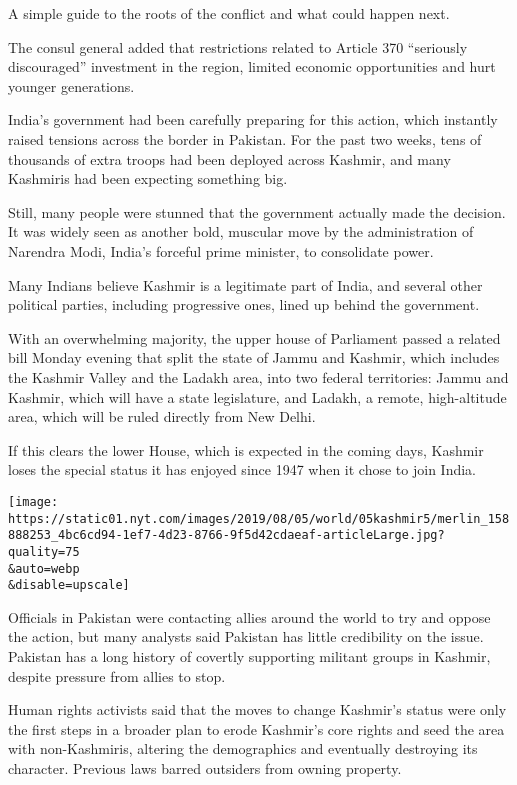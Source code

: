 A simple guide to the roots of the conflict and what could happen next.

The consul general added that restrictions related to Article 370
``seriously discouraged'' investment in the region, limited economic
opportunities and hurt younger generations.

India's government had been carefully preparing for this action, which
instantly raised tensions across the border in Pakistan. For the past
two weeks, tens of thousands of extra troops had been deployed across
Kashmir, and many Kashmiris had been expecting something big.

Still, many people were stunned that the government actually made the
decision. It was widely seen as another bold, muscular move by the
administration of Narendra Modi, India's forceful prime minister, to
consolidate power.

Many Indians believe Kashmir is a legitimate part of India, and several
other political parties, including progressive ones, lined up behind the
government.

With an overwhelming majority, the upper house of Parliament passed a
related bill Monday evening that split the state of Jammu and Kashmir,
which includes the Kashmir Valley and the Ladakh area, into two federal
territories: Jammu and Kashmir, which will have a state legislature, and
Ladakh, a remote, high-altitude area, which will be ruled directly from
New Delhi.

If this clears the lower House, which is expected in the coming days,
Kashmir loses the special status it has enjoyed since 1947 when it chose
to join India.

\texttt{[image: https://static01.nyt.com/images/2019/08/05/world/05kashmir5/merlin\_158888253\_4bc6cd94-1ef7-4d23-8766-9f5d42cdaeaf-articleLarge.jpg?quality=75\\\&auto=webp\\\&disable=upscale]}

Officials in Pakistan were contacting allies around the world to try and
oppose the action, but many analysts said Pakistan has little
credibility on the issue. Pakistan has a long history of covertly
supporting militant groups in Kashmir, despite pressure from allies to
stop.

Human rights activists said that the moves to change Kashmir's status
were only the first steps in a broader plan to erode Kashmir's core
rights and seed the area with non-Kashmiris, altering the demographics
and eventually destroying its character. Previous laws barred outsiders
from owning property.

